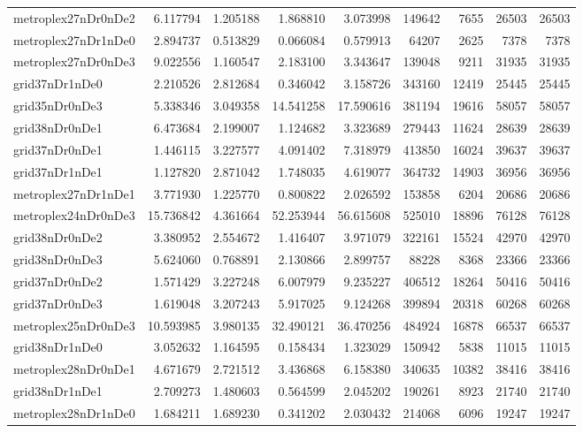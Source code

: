 \begin{longtable}{|l|r|r|r|r|r|r|r|r|}
metroplex27nDr0nDe2 & 6.117794 & 1.205188 & 1.868810 & 3.073998 & 149642 & 7655 & 26503 & 26503 \\
metroplex27nDr1nDe0 & 2.894737 & 0.513829 & 0.066084 & 0.579913 & 64207 & 2625 & 7378 & 7378 \\
metroplex27nDr0nDe3 & 9.022556 & 1.160547 & 2.183100 & 3.343647 & 139048 & 9211 & 31935 & 31935 \\
grid37nDr1nDe0 & 2.210526 & 2.812684 & 0.346042 & 3.158726 & 343160 & 12419 & 25445 & 25445 \\
grid35nDr0nDe3 & 5.338346 & 3.049358 & 14.541258 & 17.590616 & 381194 & 19616 & 58057 & 58057 \\
grid38nDr0nDe1 & 6.473684 & 2.199007 & 1.124682 & 3.323689 & 279443 & 11624 & 28639 & 28639 \\
grid37nDr0nDe1 & 1.446115 & 3.227577 & 4.091402 & 7.318979 & 413850 & 16024 & 39637 & 39637 \\
grid37nDr1nDe1 & 1.127820 & 2.871042 & 1.748035 & 4.619077 & 364732 & 14903 & 36956 & 36956 \\
metroplex27nDr1nDe1 & 3.771930 & 1.225770 & 0.800822 & 2.026592 & 153858 & 6204 & 20686 & 20686 \\
metroplex24nDr0nDe3 & 15.736842 & 4.361664 & 52.253944 & 56.615608 & 525010 & 18896 & 76128 & 76128 \\
grid38nDr0nDe2 & 3.380952 & 2.554672 & 1.416407 & 3.971079 & 322161 & 15524 & 42970 & 42970 \\
grid38nDr0nDe3 & 5.624060 & 0.768891 & 2.130866 & 2.899757 & 88228 & 8368 & 23366 & 23366 \\
grid37nDr0nDe2 & 1.571429 & 3.227248 & 6.007979 & 9.235227 & 406512 & 18264 & 50416 & 50416 \\
grid37nDr0nDe3 & 1.619048 & 3.207243 & 5.917025 & 9.124268 & 399894 & 20318 & 60268 & 60268 \\
metroplex25nDr0nDe3 & 10.593985 & 3.980135 & 32.490121 & 36.470256 & 484924 & 16878 & 66537 & 66537 \\
grid38nDr1nDe0 & 3.052632 & 1.164595 & 0.158434 & 1.323029 & 150942 & 5838 & 11015 & 11015 \\
metroplex28nDr0nDe1 & 4.671679 & 2.721512 & 3.436868 & 6.158380 & 340635 & 10382 & 38416 & 38416 \\
grid38nDr1nDe1 & 2.709273 & 1.480603 & 0.564599 & 2.045202 & 190261 & 8923 & 21740 & 21740 \\
metroplex28nDr1nDe0 & 1.684211 & 1.689230 & 0.341202 & 2.030432 & 214068 & 6096 & 19247 & 19247 \\

\end{longtable}
